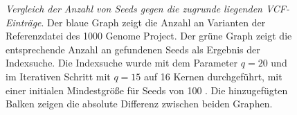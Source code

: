 \documentclass[12pt]{article}
\begin{document}
\begin{figure}[t]
\caption{\label{fig:seeds}\footnotesize \emph{Vergleich der Anzahl von Seeds gegen die zugrunde liegenden VCF-Einträge}. Der blaue Graph zeigt die Anzahl an Varianten der Referenzdatei des 1000 Genome Project. Der grüne Graph zeigt die entsprechende Anzahl an gefundenen Seeds als Ergebnis der Indexsuche. Die Indexsuche wurde mit dem Parameter $q=20$ und im Iterativen Schritt mit $q=15$ auf 16 Kernen durchgeführt, mit einer initialen Mindestgröße für Seeds von 100 . Die hinzugefügten Balken zeigen die absolute Differenz zwischen beiden Graphen.}
\end{figure}
\end{document}
